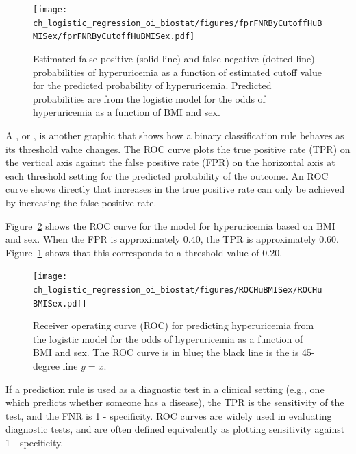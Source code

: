 \begin{figure}[!tbh]
  \centering
  \texttt{[image: ch\_logistic\_regression\_oi\_biostat/figures/fprFNRByCutoffHuBMISex/fprFNRByCutoffHuBMISex.pdf]}
    \caption{Estimated false positive (solid line) and false negative (dotted line) probabilities of hyperuricemia as a function of estimated cutoff value for the predicted probability of hyperuricemia.  Predicted probabilities are from the logistic model for the odds of hyperuricemia as a function of BMI and sex.}
    \label{figure:fprFNRByCutoffHuBMISex}
\end{figure}

A , or , is another graphic that shows how a binary classification rule behaves as its threshold value changes. The ROC curve plots the true positive rate (TPR) on the vertical axis against the false positive rate (FPR) on the horizontal axis at each threshold setting for the predicted probability of the outcome. An ROC curve shows directly that increases in the true positive rate can only be achieved by increasing the false positive rate. 

Figure~\ref{figure:ROCHuBMISex} shows the ROC curve for the model for hyperuricemia based on BMI and sex.  When the FPR is approximately 0.40, the TPR is approximately 0.60. Figure~\ref{figure:fprFNRByCutoffHuBMISex} shows that this corresponds to a threshold value of  $0.20$.


\begin{figure}[!tbh]
  \centering
  \texttt{[image: ch\_logistic\_regression\_oi\_biostat/figures/ROCHuBMISex/ROCHuBMISex.pdf]}
    \caption{Receiver operating curve (ROC) for predicting hyperuricemia from the logistic model for the odds of hyperuricemia as a function of BMI and sex. The ROC curve is in blue; the black line is the is 45-degree line $y = x$.}
    \label{figure:ROCHuBMISex}
\end{figure}

If a prediction rule is used as a diagnostic test in a clinical setting (e.g., one which predicts whether someone has a disease), the TPR is the sensitivity of the test, and the FNR is 1 - specificity.  ROC curves are widely used in evaluating diagnostic tests, and are often defined equivalently as plotting sensitivity against 1 - specificity.

